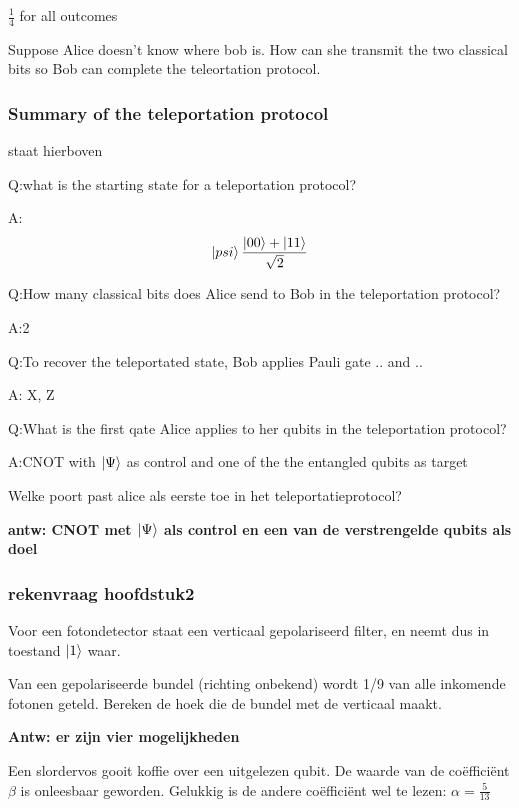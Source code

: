 \documentclass[a4paper, addpoints, 12pt
    , noanswers    %
    ]{exam}
\begin{document}
\begin{questions}
$\tfrac{1}{4}$ for all outcomes

Suppose Alice doesn't know where bob is. How can she transmit the two classical bits so Bob can complete the teleortation protocol.

\subsubsection*{Summary of the teleportation protocol}
staat hierboven 

Q:what is the starting state for a teleportation protocol?

A:$$\ket{\\psi}\frac{\ket{00}+\ket{11}}{\sqrt{2}}$$

Q:How many classical bits does Alice send to Bob in the teleportation protocol?

A:2

Q:To recover the teleportated state, Bob applies Pauli gate .. and ..

A: X, Z

Q:What is the first qate Alice applies to her qubits in the teleportation protocol?

A:CNOT with $\ket{\Psi}$ as control and one of the the entangled qubits as target 

\question[1]
Welke poort past alice als eerste toe in het teleportatieprotocol?

\ifprintanswers
\textbf{antw:
CNOT met $\ket{\Psi}$ als control en een van de verstrengelde qubits als doel 
}
\else
\fillwithlines{.5in}
\fi

\subsubsection*{rekenvraag hoofdstuk2}
Voor een fotondetector staat een verticaal gepolariseerd filter, en neemt dus in toestand $\ket{1}$ waar.

Van een gepolariseerde bundel (richting onbekend) wordt 1/9 van alle inkomende fotonen geteld.
Bereken de hoek die de bundel met de verticaal maakt.


\ifprintanswers
\textbf{Antw: er zijn vier mogelijkheden
}
\else
\fillwithlines{.5in}
\fi

Een slordervos gooit koffie over een uitgelezen qubit. De waarde van de co\"effici\"ent $\beta$ is onleesbaar geworden. Gelukkig is de andere co\"effici\"ent wel te lezen: $\alpha=\tfrac{5}{13}$
\end{questions}
\end{document}
